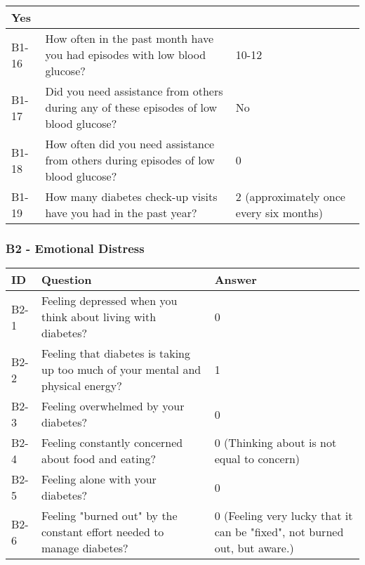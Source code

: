 \begin{table}[H]
\begin{tabularx}{\textwidth}{|l|X|l|}
        Yes  
        \\ \hline
        B1-16 & How often in the past month have you had episodes with low blood glucose? & 
        10-12 
        \\ \hline
        B1-17 & Did you need assistance from others during any of these episodes of low blood glucose? & 
        No  
        \\ \hline
        B1-18 & How often did you need assistance from others during episodes of low blood glucose? & 
        0 
        \\ \hline
        B1-19 & How many diabetes check-up visits have you had in the past year? & 
        2 (approximately once every six months) 
        \\ \hline
    \end{tabularx}
\end{table}

\subsubsection{B2 - Emotional Distress}
\begin{table}[H]
    \centering
    \renewcommand{\arraystretch}{1.2}
    \begin{tabularx}{\textwidth}{|l|X|l|}
        \hline
        \textbf{ID} & \textbf{Question} & \textbf{Answer} \\ \hline
        B2-1 & Feeling depressed when you think about living with diabetes? & 
        0  
        \\ \hline
        B2-2 & Feeling that diabetes is taking up too much of your mental and physical energy? & 
        1  
        \\ \hline
        B2-3 & Feeling overwhelmed by your diabetes? & 
        0  
        \\ \hline
        B2-4 & Feeling constantly concerned about food and eating? & 
        0 (Thinking about is not equal to concern)  
        \\ \hline
        B2-5 & Feeling alone with your diabetes? & 
        0  
        \\ \hline
        B2-6 & Feeling "burned out" by the constant effort needed to manage diabetes? & 
        0 (Feeling very lucky that it can be "fixed", not burned out, but aware.)  
        \\ \hline
    \end{tabularx}
\end{table}

